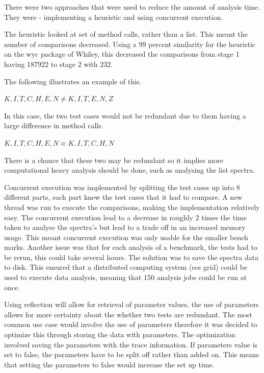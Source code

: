 There were two approaches that were used to reduce the amount of analysis time. They were - implementing a heuristic and using concurrent execution. 

The heuristic looked at set of method calls, rather than a list. This meant the number of comparisons decreased. Using a 99 percent similarity for the heuristic on the wyc package of Whiley, this decreased the comparisons from stage 1 having 187922 to stage 2 with 232. 

The following illustrates an example of this.

$K,I,T,C,H,E,N \neq K,I,T,E,N,Z $

In this case, the two test cases would not be redundant due to them having a large difference in method calls.

$K,I,T,C,H,E,N \approx K,I,T,C,H,N$

There is a chance that these two may be redundant so it implies more computational heavy analysis should be done, such as analysing the list spectra. 

Concurrent execution was implemented by splitting the test cases up into 8 different parts, each part knew the test cases that it had to compare. A new thread was run to execute the comparisons, making the implementation relatively easy. The concurrent execution lead to a decrease in roughly 2 times the time taken to analyse the spectra's but lead to a trade off in an increased memory usage. This meant concurrent execution was only usable for the smaller bench marks.
Another issue was that for each analysis of a benchmark, the tests had to be rerun, this could take several hours. The solution was to save the spectra data to disk. This ensured that a distributed computing system (ecs grid) could be used to execute data analysis, meaning that 150 analysis jobs could be run at once.

Using reflection will allow for retrieval of parameter values, the use of parameters allows for more certainty about the whether two tests are redundant. The most common use case would involve the use of parameters therefore it was decided to optimize this through storing the data with parameters. The optimization involved saving the parameters with the trace information. If parameters value is set to false, the parameters have to be split off rather than added on. This means that setting the parameters to false would increase the set up time.

